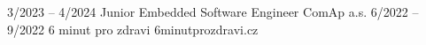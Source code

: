 \documentclass[9pt]{developercv} %
\begin{document}


\begin{entrylist}
	\entry
		{3/2023 -- 4/2024}
    	{Junior Embedded Software Engineer}
		{ComAp a.s.}
		{}
	\entry
		{6/2022 -- 9/2022}
		{6 minut pro zdravi}
		{6minutprozdravi.cz}
		{}
\end{entrylist}


\end{document}
